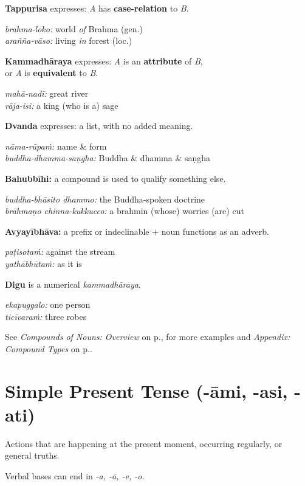 \documentclass[11pt,oneside]{memoir}
\begin{document}
\begin{twocols}


\textbf{Tappurisa} expresses: \emph{A} has \textbf{case-relation} to \emph{B}.

\emph{brahma-loko:} world \emph{of} Brahma (gen.) \\
\emph{arañña-vāso:} living \emph{in} forest (loc.)

\textbf{Kammadhāraya} expresses: \emph{A} is an \textbf{attribute} of \emph{B}, \\
or \emph{A} is \textbf{equivalent} to \emph{B}.

\emph{mahā-nadī:} great river \\
\emph{rāja-isi:}  a king (who is a) sage

\textbf{Dvanda} expresses: a list, with no added meaning.

\emph{nāma-rūpaṁ:} name \& form \\
\emph{buddha-dhamma-saṇgha:} Buddha \& dhamma \& saṇgha

\columnbreak

\textbf{Bahubbīhi:} a compound is used to qualify something else.

\emph{buddha-bhāsito dhammo:} the Buddha-spoken doctrine \\
\emph{brāhmaṇo chinna-kukkucco:} a brahmin (whose) worries (are) cut

\textbf{Avyayībhāva:} a prefix or indeclinable + noun functions as an adverb.

\emph{paṭisotaṁ:} against the stream \\
\emph{yathābhūtaṁ:} as it is

\textbf{Digu} is a numerical \emph{kammadhāraya}.

\emph{ekapuggalo:} one person \\
\emph{ticīvaraṁ:} three robes
\end{twocols}

See \emph{Compounds of Nouns: Overview} on p.\pageref{compounds-overview}, for more
examples and \emph{Appendix: Compound Types} on p.\pageref{compound-types}.
\section{Simple Present Tense (-āmi, -asi, -ati)}
\label{sec:org22adf7f}

Actions that are happening at the present moment, occurring regularly, or general truths.

Verbal bases can end in \emph{-a, -ā, -e, -o}.
\end{document}

